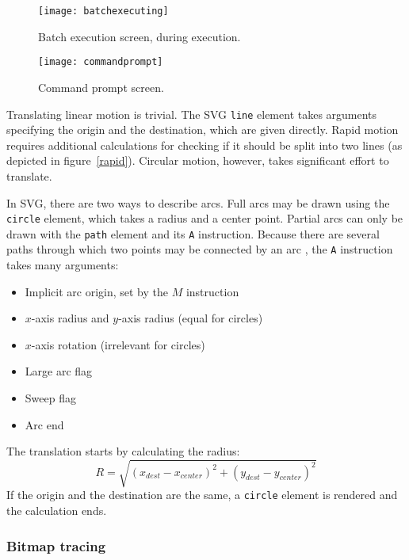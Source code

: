 \clearpage
\begin{figure}[ht]
    \begin{center}
        \texttt{[image: batchexecuting]}
        \caption{Batch execution screen, during execution.}
        \label{batch}
    \end{center}
\end{figure}
\begin{figure}[ht!]
    \begin{center}
        \texttt{[image: commandprompt]}
        \caption{Command prompt screen.}
        \label{commandprompt}
    \end{center}
\end{figure}

\clearpage
Translating linear motion is trivial. The SVG \texttt{line} element takes
arguments specifying the origin and the destination, which are given directly.
Rapid motion requires additional calculations for checking if it should be
split into two lines (as depicted in figure~\ref{rapid}). Circular motion,
however, takes significant effort to translate.

In SVG, there are two ways to describe arcs. Full arcs may be drawn using the
\texttt{circle} element, which takes a radius and a center point. Partial
arcs can only be drawn with the \texttt{path} element and its \texttt{A}
instruction. Because there are several paths through which two points may be
connected by an arc \cite{circles}, the \texttt{A} instruction takes many
arguments:

\begin{itemize}
    \item Implicit arc origin, set by the $M$ instruction
    \item $x$-axis radius and $y$-axis radius (equal for circles)
    \item $x$-axis rotation (irrelevant for circles)
    \item Large arc flag
    \item Sweep flag
    \item Arc end
\end{itemize}

The translation starts by calculating the radius:
\begin{equation*}
    R = \sqrt{(x_{dest} - x_{center})^2 + (y_{dest} - y_{center})^2}
\end{equation*}
If the origin and the destination are the same, a \texttt{circle} element is
rendered and the calculation ends.

\clearpage
\subsubsection{Bitmap tracing}
